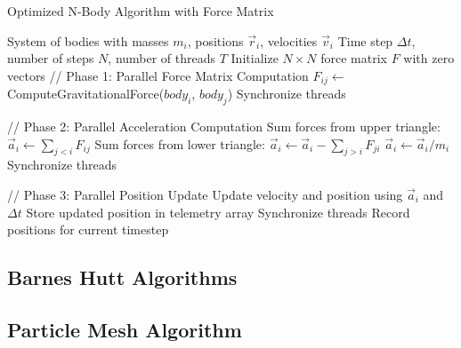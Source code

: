 \documentclass{article}
\begin{document}
\begin{algorithm}[H]
    \caption{Optimized N-Body Algorithm with Force Matrix}\label{alg:optimized_matrix}
    \begin{algorithmic}[0]
        \Require System of bodies with masses $m_i$, positions $\vec{r}_i$, velocities $\vec{v}_i$
        \Require Time step $\Delta t$, number of steps $N$, number of threads $T$
        \State Initialize $N \times N$ force matrix $F$ with zero vectors
            \State // Phase 1: Parallel Force Matrix Computation
                 
                        \State $F_{ij} \gets$ ComputeGravitationalForce($body_i$, $body_j$)
                    \EndFor
                \EndFor
            \EndFor
            \State Synchronize threads
            
            \State // Phase 2: Parallel Acceleration Computation
                    \State Sum forces from upper triangle: $\vec{a}_i \gets \sum_{j<i} F_{ij}$
                    \State Sum forces from lower triangle: $\vec{a}_i \gets \vec{a}_i - \sum_{j>i} F_{ji}$
                    \State $\vec{a}_i \gets \vec{a}_i/m_i$
                \EndFor
            \EndFor
            \State Synchronize threads
            
            \State // Phase 3: Parallel Position Update
                    \State Update velocity and position using $\vec{a}_i$ and $\Delta t$
                    \State Store updated position in telemetry array
                \EndFor
            \EndFor
            \State Synchronize threads
            \State Record positions for current timestep
        \EndFor
    \end{algorithmic}
\end{algorithm}

\subsection{Barnes Hutt Algorithms}

\subsection{Particle Mesh Algorithm}
\end{document}
